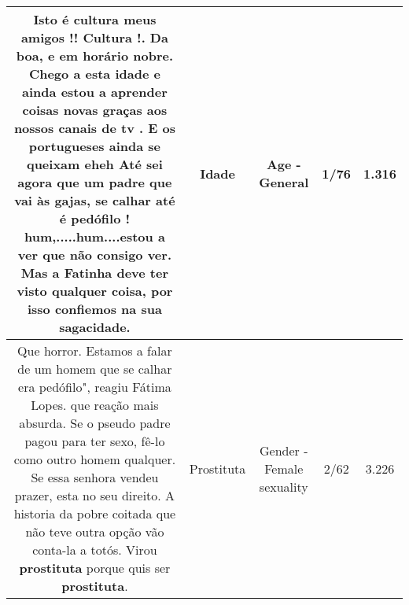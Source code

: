 \documentclass[11pt]{article}
\newlength\mylength
\begin{document}
\begin{center}
\begin{longtable}{|C{.65\mylength}|C{.30\mylength}|C{.12\mylength}|C{.12\mylength}|C{.12\mylength}|}
  \small Isto é cultura meus amigos !! Cultura !. Da boa, e em horário nobre. Chego a esta \textbf{idade} e ainda estou a aprender coisas novas graças aos nossos canais de tv . E os portugueses ainda se queixam eheh Até sei agora que um padre que vai às gajas, se calhar até é pedófilo ! hum,.....hum....estou a ver que não consigo ver. Mas a Fatinha deve ter visto qualquer coisa, por isso confiemos na sua sagacidade.\normalsize   & Idade & Age - General & 1/76 & 1.316 \\  \hline
  \small Que horror. Estamos a falar de um homem que se calhar era pedófilo", reagiu Fátima Lopes.  que reação mais absurda. Se o pseudo padre pagou para ter sexo, fê-lo como outro homem qualquer. Se essa senhora vendeu prazer, esta no seu direito. A historia da pobre coitada que não teve outra opção vão conta-la a totós. Virou \textbf{prostituta} porque quis ser \textbf{prostituta}.\normalsize   & Prostituta & Gender - Female sexuality & 2/62 & 3.226 \\  \hline
  
\end{longtable}
\end{center}
\end{document}
